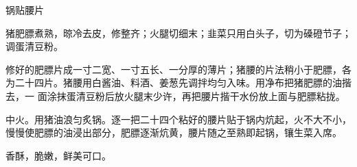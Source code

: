 %
%
%
%
%
%
%
\begin{recipe}{锅贴腰片}

\ingredients


\preparation

\step 猪肥膘煮熟，晾冷去皮，修整齐；火腿切细末；韭菜只用白头子，切为磉磴节子；
调蛋清豆粉。

\step 修好的肥膘片成一寸二宽、一寸五长、一分厚的薄片；猪腰的片法稍小于肥膘，各
为二十四片。猪腰用白酱油、料酒、姜葱先调拌均匀入味。用净布把猪肥膘的油揩去，一
面涂抹蛋清豆粉后放火腿末少许，再把腰片揩干水份放上面与肥膘粘拢。

\step 中火。用猪油浪匀炙锅。逐一把二十四个粘好的腰片贴于锅内炕起，火不大不小，
慢慢使肥膘的油浸出部分，肥膘逐渐炕黄，腰片随之至熟即起锅，镶生菜入席。

\features

香酥，脆嫩，鲜美可口。

\end{recipe}

